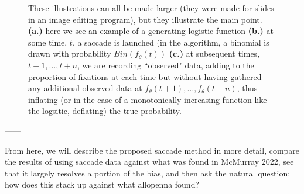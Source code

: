 \documentclass{article}
\begin{document}
\begin{figure}
    \centering
    \caption{These illustrations can all be made larger (they were made for slides in an image editing program), but they illustrate the main point. \textbf{(a.)} here we see an example of a generating logistic function \textbf{(b.)} at some time, $t$, a saccade is launched (in the algorithm, a binomial is drawn with probability $Bin(f_{\theta}(t))$ \textbf{(c.)} at subsequent times, $t+1, \dots, t+n$, we are recording ``observed" data, adding to the proportion of fixations at each time but without having gathered any additional observed data at $f_{\theta}(t+1), \dots,f_{\theta}(t+n)$, thus inflating (or in the case of a monotonically increasing function like the logsitic, deflating) the true probability. }
\label{fig:folly_of_fixation}
\end{figure}

------

From here, we will describe the proposed saccade method in more detail, compare the results of using saccade data against what was found in McMurray 2022, see that it largely resolves a portion of the bias, and then ask the natural question: how does this stack up against what allopenna found?
\end{document}
